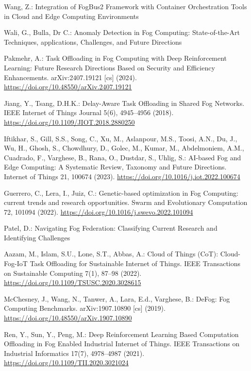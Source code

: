 \documentclass{svproc}
\begin{document}
\begin{thebibliography}{99}
Wang, Z.: Integration of FogBus2 Framework with Container Orchestration Tools in Cloud and Edge Computing Environments

Wali, G., Bulla, Dr C.: Anomaly Detection in Fog Computing: State-of-the-Art Techniques, applications, Challenges, and Future Directions

Pakmehr, A.: Task Offloading in Fog Computing with Deep Reinforcement Learning: Future Research Directions Based on Security and Efficiency Enhancements. arXiv:2407.19121 [cs] (2024). \url{https://doi.org/10.48550/arXiv.2407.19121}

Jiang, Y., Tsang, D.H.K.: Delay-Aware Task Offloading in Shared Fog Networks. IEEE Internet of Things Journal 5(6), 4945--4956 (2018). \url{https://doi.org/10.1109/JIOT.2018.2880250}

Iftikhar, S., Gill, S.S., Song, C., Xu, M., Aslanpour, M.S., Toosi, A.N., Du, J., Wu, H., Ghosh, S., Chowdhury, D., Golec, M., Kumar, M., Abdelmoniem, A.M., Cuadrado, F., Varghese, B., Rana, O., Dustdar, S., Uhlig, S.: AI-based Fog and Edge Computing: A Systematic Review, Taxonomy and Future Directions. Internet of Things 21, 100674 (2023). \url{https://doi.org/10.1016/j.iot.2022.100674}

Guerrero, C., Lera, I., Juiz, C.: Genetic-based optimization in Fog Computing: current trends and research opportunities. Swarm and Evolutionary Computation 72, 101094 (2022). \url{https://doi.org/10.1016/j.swevo.2022.101094}

Patel, D.: Navigating Fog Federation: Classifying Current Research and Identifying Challenges

Aazam, M., Islam, S.U., Lone, S.T., Abbas, A.: Cloud of Things (CoT): Cloud-Fog-IoT Task Offloading for Sustainable Internet of Things. IEEE Transactions on Sustainable Computing 7(1), 87--98 (2022). \url{https://doi.org/10.1109/TSUSC.2020.3028615}

McChesney, J., Wang, N., Tanwer, A., Lara, E.d., Varghese, B.: DeFog: Fog Computing Benchmarks. arXiv:1907.10890 [cs] (2019). \url{https://doi.org/10.48550/arXiv.1907.10890}

Ren, Y., Sun, Y., Peng, M.: Deep Reinforcement Learning Based Computation Offloading in Fog Enabled Industrial Internet of Things. IEEE Transactions on Industrial Informatics 17(7), 4978--4987 (2021). \url{https://doi.org/10.1109/TII.2020.3021024}


\end{thebibliography}
\end{document}
